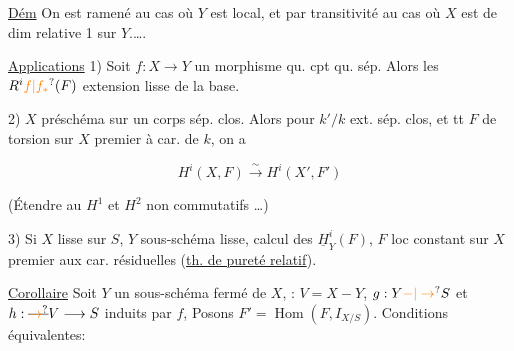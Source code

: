 
\uline{Dém} \quad On est ramené au cas où
$Y$ est   local, et par transitivité au cas
où $X$ est de dim relative 1 sur $Y$.\thinspace\ldots\thinspace.


\uline{Applications} 1) Soit $f:X\longrightarrow Y$ un morphisme qu. cpt
\llap{\smash{\rule[-2.1ex]{.4pt}{4.6ex}}\hspace{.65em}}qu. sép. Alors les $R^i\unsure{f|f_*}(F)$  
 extension lisse de la base.


2) $X$ préschéma sur un corps sép. clos. Alors
pour $k'/k$ ext. sép. clos, et tt $F$ de
torsion sur $X$ premier  à car. de $k$, on
a

\[ H^i(X,F)\xrightarrow{\sim}H^i(X',F') \]

(Étendre au $H^1$ et $H^2$ non commutatifs \ldots)

3) Si $X$ lisse sur $S$, $Y$ sous-schéma lisse,
calcul des $\underline H^i_Y(F)$, $F$ loc constant sur
$X$ premier aux car. résiduelles (\uline{th. de
pureté relatif}).


\uline{Corollaire} \quad Soit $Y$ un sous-schéma fermé
de $X$,   : $V=X-Y$, $g:Y\unsure{-|\to} S$ et
$h:\deleted{\unsure{\to}} V\longrightarrow S$ induits par $f$, Posons
$F'=\operatorname{Hom}(F,I_{X/S})$. Conditions équivalentes:



